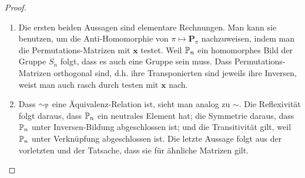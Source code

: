             \begin{proof}

                \begin{enumerate}[
                    label = \texttt{ad} \arabic*.,
                    wide,
                    labelindent = 0pt
                ]

                    \item Die ersten beiden Aussagen sind elementare Rechnungen.
                    Man kann sie benutzen, um die Anti-Homomorphie von $\pi \mapsto \mathbf P_\pi$ nachzuweisen, indem man die Permutations-Matrizen mit $\mathbf x$ testet.
                    Weil $\P_n$ ein homomorphes Bild der Gruppe $S_n$ folgt, dass es auch eine Gruppe sein muss.
                    Dass Permutations-Matrizen orthogonal sind, d.h. ihre Transponierten sind jeweils ihre Inversen, weist man auch rasch durch testen mit $\mathbf x$ nach.

                    \item Dass $\sim_{\P}$ eine Äquivalenz-Relation ist, sieht man analog zu $\sim$.
                    Die Reflexivität folgt daraus, dass $\P_n$ ein neutrales Element hat;
                    die Symmetrie daraus, dass $\P_n$ unter Inversen-Bildung abgeschlossen ist;
                    und die Transitivität gilt, weil $\P_n$ unter Verknüpfung abgeschlossen ist.
                    Die letzte Aussage folgt aus der vorletzten und der Tatsache, dass sie für ähnliche Matrizen gilt.

                \end{enumerate}

            \end{proof}

